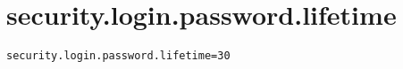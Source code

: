 \section{security.login.password.lifetime}
\label{configuration:SecurityLoginPasswordLifetime}
\ClearAPI
\TODO
{}
\begin{lstlisting}[style=Props,caption={Usage example for \textit{security.login.password.lifetime}}]
security.login.password.lifetime=30
\end{lstlisting}